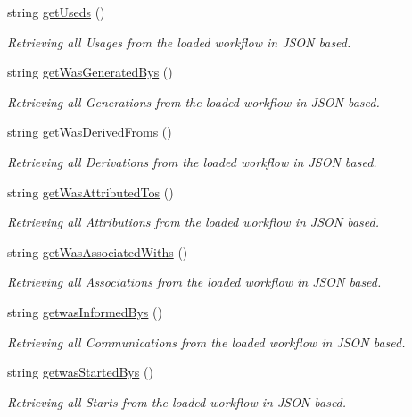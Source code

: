 \begin{DoxyCompactItemize}
string \hyperlink{class_in_di_prov_client_a88514328d91e2c6946b343176fabf650}{get\-Useds} ()
\begin{DoxyCompactList}\small\item\em Retrieving all Usages from the loaded workflow in J\-S\-O\-N based. \end{DoxyCompactList}\item 
string \hyperlink{class_in_di_prov_client_abe2dc19daa8dfa5b04fb3ac623e47bc0}{get\-Was\-Generated\-Bys} ()
\begin{DoxyCompactList}\small\item\em Retrieving all Generations from the loaded workflow in J\-S\-O\-N based. \end{DoxyCompactList}\item 
string \hyperlink{class_in_di_prov_client_adffc2e33efbc970dbb2f8bb7c5332744}{get\-Was\-Derived\-Froms} ()
\begin{DoxyCompactList}\small\item\em Retrieving all Derivations from the loaded workflow in J\-S\-O\-N based. \end{DoxyCompactList}\item 
string \hyperlink{class_in_di_prov_client_a73cf344a968785eb407488c423e00cf2}{get\-Was\-Attributed\-Tos} ()
\begin{DoxyCompactList}\small\item\em Retrieving all Attributions from the loaded workflow in J\-S\-O\-N based. \end{DoxyCompactList}\item 
string \hyperlink{class_in_di_prov_client_af0c7484225b5415c89b10f73f61ad3d1}{get\-Was\-Associated\-Withs} ()
\begin{DoxyCompactList}\small\item\em Retrieving all Associations from the loaded workflow in J\-S\-O\-N based. \end{DoxyCompactList}\item 
string \hyperlink{class_in_di_prov_client_a1ca1cc7ed3c7f08451ae78a2af50b223}{getwas\-Informed\-Bys} ()
\begin{DoxyCompactList}\small\item\em Retrieving all Communications from the loaded workflow in J\-S\-O\-N based. \end{DoxyCompactList}\item 
string \hyperlink{class_in_di_prov_client_aef39fc253d97b3534b8772ece2d01735}{getwas\-Started\-Bys} ()
\begin{DoxyCompactList}\small\item\em Retrieving all Starts from the loaded workflow in J\-S\-O\-N based. \end{DoxyCompactList}\item 

\end{DoxyCompactItemize}
